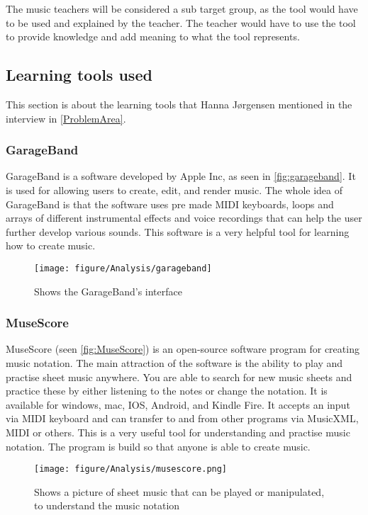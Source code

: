The music teachers will be considered a sub target group, as the tool would have to be used and explained by the teacher. The teacher would have to use the tool to provide knowledge and add meaning to what the tool represents.
 
\subsection{Learning tools used}%
This section is about the learning tools that Hanna Jørgensen mentioned in the interview in \autoref{ProblemArea}.  

\subsubsection{GarageBand}
GarageBand is a software developed by Apple Inc, as seen in \autoref{fig:garageband}. It is used for allowing users to create, edit, and render music. The whole idea of GarageBand is that the software uses pre made MIDI keyboards, loops and arrays of different instrumental effects and voice recordings that can help the user further develop various sounds. This software is a very helpful tool for learning how to create music.
\begin{figure}[H]
	\centering
	\texttt{[image: figure/Analysis/garageband]}
	
	\caption{Shows the GarageBand's interface}
	\label{fig:garageband}
\end{figure}


\subsubsection{MuseScore}
MuseScore (seen \autoref{fig:MuseScore}) is an open-source software program for creating music notation. The main attraction of the software is the ability to play and practise sheet music anywhere. You are able to search for new music sheets and practice these by either listening to the notes or change the notation. It is available for windows, mac, IOS, Android, and Kindle Fire. It accepts an input via MIDI keyboard and can transfer to and from other programs via MusicXML, MIDI or others. This is a very useful tool for understanding and practise music notation. The program is build so that anyone is able to create music.

\begin{figure}[H]
	\centering
	\texttt{[image: figure/Analysis/musescore.png]}
	\caption{Shows a picture of sheet music that can be played or manipulated, to understand the music notation}
	\label{fig:MuseScore}
\end{figure}

